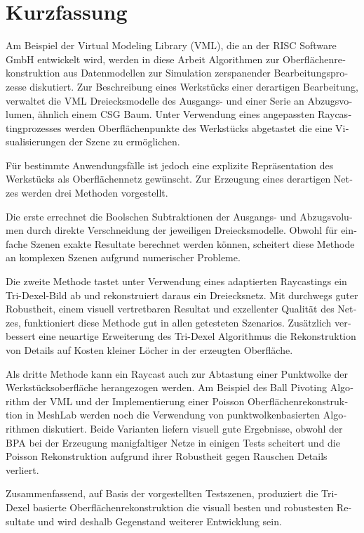 \chapter*{Kurzfassung}

\begin{otherlanguage}{ngerman}
	Am Beispiel der Virtual Modeling Library (VML), die an der RISC Software GmbH entwickelt wird, werden in diese Arbeit Algorithmen zur Oberflächenrekonstruktion aus Datenmodellen zur Simulation zerspanender Bearbeitungsprozesse diskutiert.
	Zur Beschreibung eines Werkstücks einer derartigen Bearbeitung, verwaltet die VML Dreiecksmodelle des Ausgangs- und einer Serie an Abzugsvolumen, ähnlich einem CSG Baum.
	Unter Verwendung eines angepassten Raycastingprozesses werden Oberflächenpunkte des Werkstücks abgetastet die eine Visualisierungen der Szene zu ermöglichen.

	Für bestimmte Anwendungsfälle ist jedoch eine explizite Repräsentation des Werkstücks als Oberflächennetz gewünscht.
	Zur Erzeugung eines derartigen Netzes werden drei Methoden vorgestellt.

	Die erste errechnet die Boolschen Subtraktionen der Ausgangs- und Abzugsvolumen durch direkte Verschneidung der jeweiligen Dreiecksmodelle.
	Obwohl für einfache Szenen exakte Resultate berechnet werden können, scheitert diese Methode an komplexen Szenen aufgrund numerischer Probleme.

	Die zweite Methode tastet unter Verwendung eines adaptierten Raycastings ein Tri-Dexel-Bild ab und rekonstruiert daraus ein Dreiecksnetz.
	Mit durchwegs guter Robustheit, einem visuell vertretbaren Resultat und exzellenter Qualität des Netzes, funktioniert diese Methode gut in allen getesteten Szenarios.
	Zusätzlich verbessert eine neuartige Erweiterung des Tri-Dexel Algorithmus die Rekonstruktion von Details auf Kosten kleiner Löcher in der erzeugten Oberfläche.

	Als dritte Methode kann ein Raycast auch zur Abtastung einer Punktwolke der Werkstücksoberfläche herangezogen werden.
	Am Beispiel des Ball Pivoting Algorithm der VML und der Implementierung einer Poisson Oberflächenrekonstruktion in MeshLab werden noch die Verwendung von punktwolkenbasierten Algorithmen diskutiert.
	Beide Varianten liefern visuell gute Ergebnisse, obwohl der BPA bei der Erzeugung manigfaltiger Netze in einigen Tests scheitert und die Poisson Rekonstruktion aufgrund ihrer Robustheit gegen Rauschen Details verliert.

	Zusammenfassend, auf Basis der vorgestellten Testszenen, produziert die Tri-Dexel basierte Oberflächenrekonstruktion die visuall besten und robustesten Resultate und wird deshalb Gegenstand weiterer Entwicklung sein.
\end{otherlanguage}


